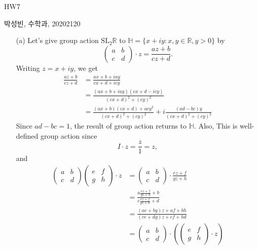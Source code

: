 \documentclass[a4paper, 12pt]{article}
\theoremstyle{Mydefinition}
\theoremstyle{Mytheorem}
\begin{document}
\thispagestyle{myfirstpage}
\begin{center}
	\Large{HW7}
\end{center}
박성빈, 수학과, 20202120

\begin{enumerate}
    \item[(a)] Let's give group action $\textrm{SL}_2\mathbb{R}$ to $\mathbb{H} = \{x+iy:x,y\in \mathbb{R}, y>0\}$ by
    \begin{equation}
        \begin{pmatrix}
            a & b\\
            c & d
        \end{pmatrix}\cdot z = \frac{az+b}{cz+d}.
    \end{equation}
    Writing $z=x+iy$, we get
    \begin{equation}\label{HW6:1_2}
    \begin{split}
        \frac{az+b}{cz+d} &= \frac{ax+b+iay}{cx+d+icy}\\
        &=\frac{(ax+b+iay)(cx+d-icy)}{(cx+d)^2+(cy)^2}\\
        &=\frac{(ax+b)(cx+d)+acy^2}{(cx+d)^2+(cy)^2} + i\frac{(ad-bc)y}{(cx+d)^2+(cy)^2}
    \end{split}
    \end{equation}
    Since $ad-bc = 1$, the result of group action returns to $\mathbb{H}$. Also, This is well-defined group action since
    \begin{equation}
            I\cdot z = \frac{z}{1}=z,
    \end{equation}
    and
    \begin{equation}
        \begin{split}
            \begin{pmatrix}
            a & b\\
            c & d
        \end{pmatrix}\begin{pmatrix}
            e & f\\
            g & h
        \end{pmatrix}\cdot z &= \begin{pmatrix}
            a & b\\
            c & d
        \end{pmatrix}\cdot \frac{ez+f}{gz+h}\\
        &=\frac{a\frac{ez+f}{gz+h}+b}{c\frac{ez+f}{gz+h}+d}\\
        &=\frac{(ae+bg)z+af+bh}{(ce+dg)z+cf + hd}\\
        &=\begin{pmatrix}
            a & b\\
            c & d
        \end{pmatrix}\cdot\left(\begin{pmatrix}
            e & f\\
            g & h
        \end{pmatrix}\cdot z\right)
        \end{split}
    \end{equation}
    

\end{enumerate}
\end{document}
